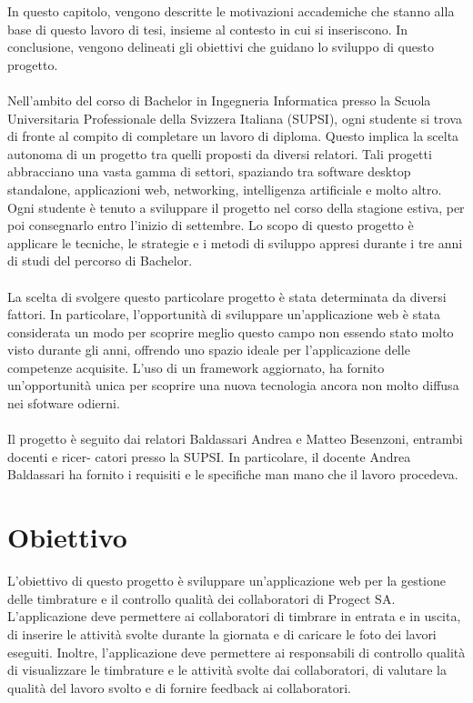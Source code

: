 \documentclass[twoside]{supsistudent}
\begin{document}
In questo capitolo, vengono descritte le motivazioni accademiche che stanno alla base di
questo lavoro di tesi, insieme al contesto in cui si inseriscono. In conclusione, vengono
delineati gli obiettivi che guidano lo sviluppo di questo progetto.\\
\\
Nell'ambito del corso di Bachelor in Ingegneria Informatica presso la Scuola Universitaria
Professionale della Svizzera Italiana (SUPSI), ogni studente si trova di fronte al compito di
completare un lavoro di diploma. Questo implica la scelta autonoma di un progetto tra quelli
proposti da diversi relatori. Tali progetti abbracciano una vasta gamma di settori, spaziando
tra software desktop standalone, applicazioni web, networking, intelligenza artificiale e molto
altro. Ogni studente è tenuto a sviluppare il progetto nel corso della stagione estiva, per poi
consegnarlo entro l'inizio di settembre. Lo scopo di questo progetto è applicare le tecniche,
le strategie e i metodi di sviluppo appresi durante i tre anni di studi del percorso di Bachelor.\\
\\
La scelta di svolgere questo particolare progetto è stata determinata da diversi fattori. In
particolare, l'opportunità di sviluppare un'applicazione web è stata considerata un modo
per scoprire meglio questo campo non essendo stato molto visto durante gli anni, offrendo
uno spazio ideale per l'applicazione delle competenze acquisite. L'uso di un framework
aggiornato, ha fornito un'opportunità unica per scoprire una nuova tecnologia ancora non molto
diffusa nei sfotware odierni.\\
\\
Il progetto è seguito dai relatori Baldassari Andrea e Matteo Besenzoni, entrambi docenti e ricer-
catori presso la SUPSI. In particolare, il docente Andrea Baldassari ha fornito i requisiti e le specifiche man mano che il lavoro procedeva.

\section{Obiettivo}
L'obiettivo di questo progetto è sviluppare un'applicazione web per la gestione delle timbrature
e il controllo qualità dei collaboratori di Progect SA. L'applicazione deve permettere ai
collaboratori di timbrare in entrata e in uscita, di inserire le attività svolte durante la giornata
e di caricare le foto dei lavori eseguiti. Inoltre, l'applicazione deve permettere ai responsabili
di controllo qualità di visualizzare le timbrature e le attività svolte dai collaboratori, di
valutare la qualità del lavoro svolto e di fornire feedback ai collaboratori.\\
\\
\end{document}

